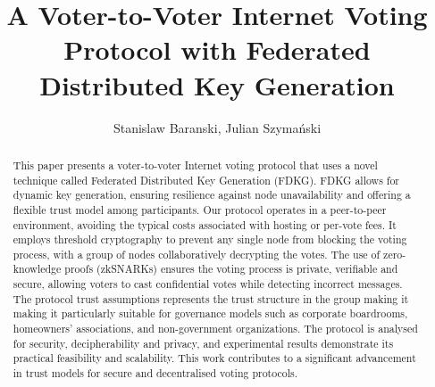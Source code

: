 \documentclass[runningheads]{llncs}
\title{A Voter-to-Voter Internet Voting Protocol with Federated Distributed Key Generation}
\author{Stanislaw Baranski\inst{1}, Julian Szymański\inst{1}}
\institute{Gdansk University of Technology, Narutowicza 11/12 80-233, Gdansk, Poland \email{\{stanislaw.baranski,julian.szymanski\}@pg.edu.pl}}
\begin{document}
\maketitle



\begin{abstract}
This paper presents a voter-to-voter Internet voting protocol that uses a novel technique called Federated Distributed Key Generation (FDKG).
FDKG allows for dynamic key generation, ensuring resilience against node unavailability and offering a flexible trust model among participants.
Our protocol operates in a peer-to-peer environment, avoiding the typical costs associated with hosting or per-vote fees. It employs threshold cryptography to prevent any single node from blocking the voting process, with a group of nodes collaboratively decrypting the votes.
The use of zero-knowledge proofs (zkSNARKs) ensures the voting process is private, verifiable and secure, allowing voters to cast confidential votes while detecting incorrect messages. 
The protocol trust assumptions represents the trust structure in the group making it making it particularly suitable for governance models such as corporate boardrooms, homeowners' associations, and non-government organizations.
The protocol is analysed for security, decipherability and privacy, and experimental results demonstrate its practical feasibility and scalability. This work contributes to a significant advancement in trust models for secure and decentralised voting protocols.
\end{abstract}
\end{document}
